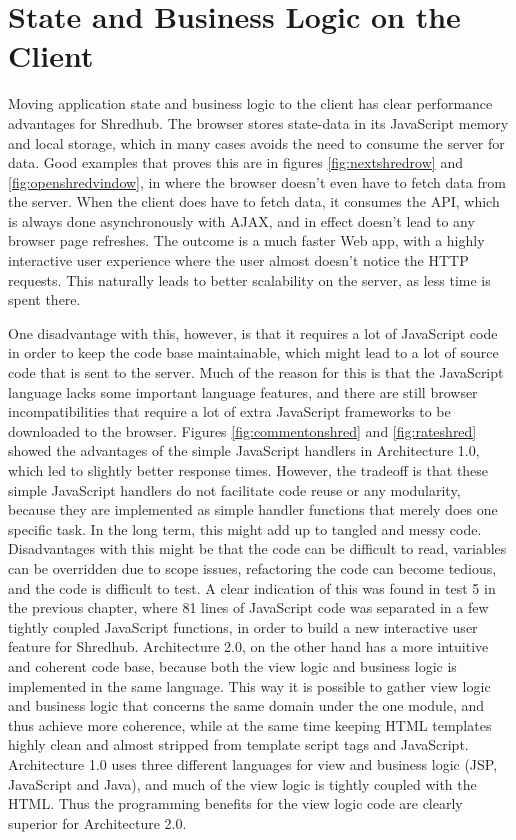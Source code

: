 \section{State and Business Logic on the Client}
Moving application state and business logic to the client has clear performance advantages for Shredhub. The browser stores state-data in its JavaScript memory and local storage, which in many cases avoids the need to consume the server for data. Good  examples that proves this are in figures \vref{fig:nextshredrow} and \vref{fig:openshredvindow}, in where the browser doesn't even have to fetch data from the server. When the client does have to fetch data, it consumes the API, which is always done asynchronously with AJAX, and in effect doesn't lead to any browser page refreshes. The outcome is a much faster Web app, with a highly interactive user experience where the user almost doesn't notice the HTTP requests. This naturally leads to better scalability on the server, as less time is spent there.

One disadvantage with this, however, is that it requires a lot of JavaScript code in order to keep the code base maintainable, which might lead to a lot of source code that is sent to the server. Much of the reason for this is that the JavaScript language lacks some important language features, and there are still browser incompatibilities that require a lot of extra JavaScript frameworks to be downloaded to the browser. Figures  \vref{fig:commentonshred} and \vref{fig:rateshred} showed the advantages of the simple JavaScript handlers in Architecture 1.0, which led to slightly better response times. However, the tradeoff is that these simple JavaScript handlers do not facilitate code reuse or any modularity, because they are implemented as simple handler functions that merely does one specific task. In the long term, this might add up to tangled and messy code. Disadvantages with this might be that the code can be difficult to read, variables can be overridden due to scope issues, refactoring the code can become tedious, and the code is difficult to test. A clear indication of this was found in test 5 in the previous chapter, where 81 lines of JavaScript code was separated in a few tightly coupled JavaScript functions, in order to build a new interactive user feature for Shredhub. Architecture 2.0, on the other hand has a more intuitive and  coherent code base, because both the view logic and business logic is implemented in the same language. This way it is possible to gather view logic and business logic that concerns the same domain under the one module, and thus achieve more coherence, while at the same time keeping HTML templates highly clean and almost stripped from template script tags and JavaScript. Architecture 1.0 uses three different languages for view and business logic (JSP, JavaScript and Java), and much of the view logic is tightly coupled with the HTML. Thus the programming benefits for the view logic code are clearly superior for Architecture 2.0. 

